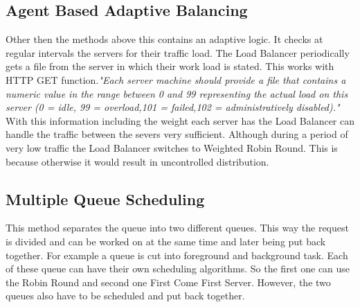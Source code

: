 \documentclass[12p]{article}
\begin{document}
	\subsection{Agent Based Adaptive Balancing}
	Other then the methods above this contains an adaptive logic. It checks at regular intervals the servers for their traffic load. The Load Balancer periodically gets a file from the server in which their work load is stated. This works with HTTP GET function.\textit{"Each server machine should  provide a file that contains a numeric value in the range between 0 and 99 representing the  actual load on this server (0 = idle, 99 = overload,101 = failed,102 = administratively disabled)."}\cite{schedu} With this information  including the weight each server has the Load Balancer can handle the traffic between the severs very sufficient. Although during a period of very low traffic the Load Balancer switches to Weighted Robin Round. This is because otherwise it would result in uncontrolled distribution.
	
	\subsection{Multiple Queue Scheduling}
	This method separates the queue into two different queues. This way the request is divided and can be worked on at the same time and later being put back together. For example a queue is cut into foreground and background task. Each of these queue can have their own scheduling algorithms. So the first one can use the Robin Round and second one First Come First Server. However, the two queues also have to be scheduled and put back together. 
	
	
\end{document}

